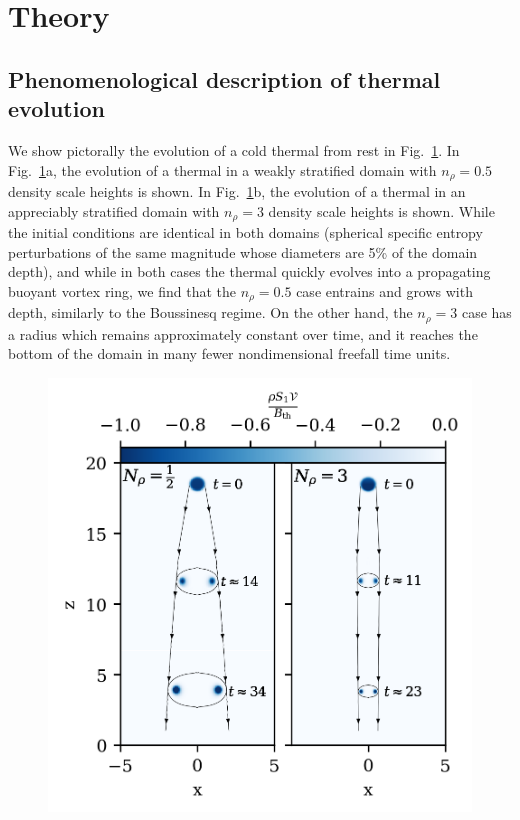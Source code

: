 \documentclass[twocolumn, amsmath, amsfonts, amssymb, trackchanges]{aastex62}
\begin{document}
\section{Theory}
\label{sec:theory}

\subsection{Phenomenological description of thermal evolution}
We show pictorally the evolution of a cold thermal from rest in 
Fig.~\ref{fig:evolution_colormeshes}. In Fig.~\ref{fig:evolution_colormeshes}a,
the evolution of a thermal in a weakly stratified domain with
$n_\rho = 0.5$ density scale heights is shown. In Fig.~\ref{fig:evolution_colormeshes}b,
the evolution of a thermal in an appreciably stratified domain with
$n_\rho = 3$ density scale heights is shown. While the initial conditions are
identical in both domains (spherical specific entropy perturbations of the
same magnitude whose diameters are 5\% of the domain depth), and while in both cases
the thermal quickly evolves into a propagating buoyant vortex ring, we find that the
$n_\rho = 0.5$ case entrains and grows with depth, similarly to the Boussinesq regime.
On the other hand, the $n_\rho = 3$ case has a radius which remains approximately constant
over time, and it reaches the bottom of the domain in many fewer nondimensional freefall
time units.

\begin{figure}[t!]
    \includegraphics[width=\columnwidth]{evolution_colormeshes.png}
    \caption{
    \label{fig:evolution_colormeshes} }
\end{figure}
\end{document}
